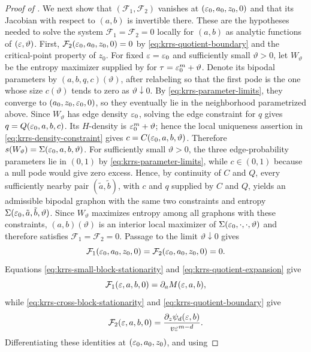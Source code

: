 \begin{proof}[Proof of ]
We next show that \((\mathcal F_1,\mathcal F_2)\) vanishes at
\((\varepsilon_0,a_0,z_0,0)\) and that its Jacobian with respect to \((a,b)\) is
invertible there.  These are the hypotheses needed to solve the system
\(\mathcal F_1=\mathcal F_2=0\) locally for \((a,b)\) as analytic functions
of \((\varepsilon,\vartheta)\).  First,
\(\mathcal F_2(\varepsilon_0,a_0,z_0,0)=0\) by
\eqref{eq:krrs-quotient-boundary} and the critical-point property of \(z_0\).  For
fixed \(\varepsilon=\varepsilon_0\) and sufficiently small \(\vartheta>0\), let
\(W_\vartheta\) be the entropy maximizer supplied by
 for \(\tau=\varepsilon_0^m+\vartheta\).  Denote its bipodal
parameters by \((a,b,q,c)(\vartheta)\), after relabeling so that the first
pode is the one whose size \(c(\vartheta)\) tends to zero as
\(\vartheta\downarrow0\).  By \eqref{eq:krrs-parameter-limits}, they converge to
\((a_0,z_0,\varepsilon_0,0)\), so they eventually lie in the neighborhood
parametrized above.  Since \(W_\vartheta\) has edge density \(\varepsilon_0\),
solving the edge constraint for \(q\) gives
\(q=Q(\varepsilon_0,a,b,c)\).  Its \(H\)-density is
\(\varepsilon_0^m+\vartheta\); hence the local uniqueness assertion in
\eqref{eq:krrs-density-constraint} gives
\(c=C(\varepsilon_0,a,b,\vartheta)\).  Therefore
\(s(W_\vartheta)=\Sigma(\varepsilon_0,a,b,\vartheta)\).  For sufficiently small
\(\vartheta>0\), the three edge-probability parameters lie in \((0,1)\) by
\eqref{eq:krrs-parameter-limits}, while \(c\in(0,1)\) because a null pode would give
zero excess.  Hence, by continuity of \(C\) and \(Q\), every sufficiently
nearby pair \((\tilde a,\tilde b)\), with \(c\) and \(q\) supplied by \(C\)
and \(Q\), yields an admissible bipodal graphon with the same two constraints
and entropy \(\Sigma(\varepsilon_0,\tilde a,\tilde b,\vartheta)\).  Since
\(W_\vartheta\) maximizes entropy among all graphons with these constraints,
\((a,b)(\vartheta)\) is an interior local maximizer of
\(\Sigma(\varepsilon_0,\cdot,\cdot,\vartheta)\) and therefore satisfies
\(\mathcal F_1=\mathcal F_2=0\).  Passage to the limit
\(\vartheta\downarrow0\) gives
\begin{equation}\label{eq:krrs-boundary-stationarity}
  \mathcal F_1(\varepsilon_0,a_0,z_0,0)
  =\mathcal F_2(\varepsilon_0,a_0,z_0,0)=0.
\end{equation}
Equations \eqref{eq:krrs-small-block-stationarity} and \eqref{eq:krrs-quotient-expansion} give
\[
  \mathcal F_1(\varepsilon,a,b,0)=\partial_aM(\varepsilon,a,b),
\]
while \eqref{eq:krrs-cross-block-stationarity} and \eqref{eq:krrs-quotient-boundary} give
\[
  \mathcal F_2(\varepsilon,a,b,0)
  =\frac{\partial_z\psi_d(\varepsilon,b)}{v\varepsilon^{m-d}}.
\]
Differentiating these identities at \((\varepsilon_0,a_0,z_0)\), and using

\end{proof}
